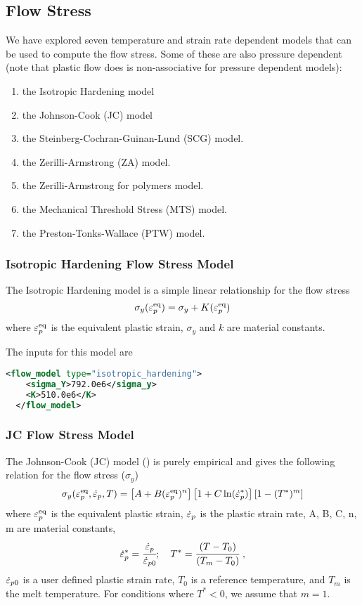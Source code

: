 \subsection{Flow Stress}
  We have explored seven temperature and strain rate dependent
  models that can be used to compute the flow stress.  Some of these are also
  pressure dependent (note that plastic flow does is non-associative for
  pressure dependent models):
  \begin{enumerate}
    \item the Isotropic Hardening model
    \item the Johnson-Cook (JC) model
    \item the Steinberg-Cochran-Guinan-Lund (SCG) model.
    \item the Zerilli-Armstrong (ZA) model.
    \item the Zerilli-Armstrong for polymers model.
    \item the Mechanical Threshold Stress (MTS) model.
    \item the Preston-Tonks-Wallace (PTW) model.
  \end{enumerate}

  \subsubsection{Isotropic Hardening Flow Stress Model}
  The Isotropic Hardening model is a simple linear relationship for the flow stress
  \begin{equation}
    \sigma_y(\varepsilon_p^\text{eq}) = \sigma_y + K (\varepsilon_p^\text{eq})
  \end{equation}
  where $\varepsilon_p^\text{eq}$ is the equivalent plastic strain, $\sigma_y$ and $k$ are material constants.

  The inputs for this model are
  \begin{lstlisting}[language=XML]
  <flow_model type="isotropic_hardening">
    <sigma_Y>792.0e6</sigma_y>
    <K>510.0e6</K>
  </flow_model>
  \end{lstlisting}

  \subsubsection{JC Flow Stress Model}
  The Johnson-Cook (JC) model (\cite{Johnson1983}) is purely empirical and gives
  the following relation for the flow stress ($\sigma_y$)
  \begin{equation}
    \sigma_y(\varepsilon_p^\text{eq},\dot{\varepsilon}_{p},T) = 
    \left[A + B (\varepsilon_p^\text{eq})^n\right]\left[1 + C \ln(\dot{\varepsilon}_{p}^{*})\right]
    \left[1 - (T^*)^m\right]
  \end{equation}
  where $\varepsilon_p^\text{eq}$ is the equivalent plastic strain, $\dot{\varepsilon}_{p}$ is the
  plastic strain rate, A, B, C, n, m are material constants,
  \begin{equation}
    \dot{\varepsilon}_{p}^{*} = \cfrac{\dot{\varepsilon}_{p}}{\dot{\varepsilon}_{p0}}; \quad
    T^* = \cfrac{(T-T_0)}{(T_m-T_0)}~,
  \end{equation}
  $\dot{\varepsilon}_{p0}$ is a user defined plastic strain rate,
  $T_0$ is a reference temperature, and $T_m$ is the melt temperature.
  For conditions where $T^* < 0$, we assume that $m = 1$.


